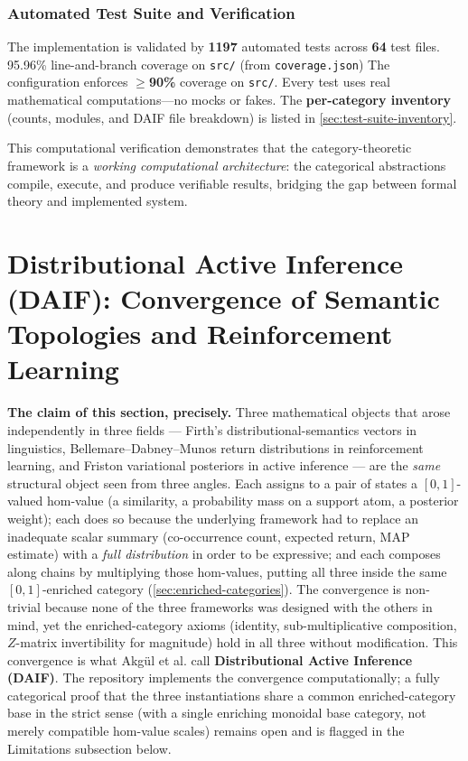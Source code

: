 \documentclass[
]{article}
\newcounter{none} %
\begin{document}
\subsubsection{Automated Test Suite and
Verification}\label{automated-test-suite-and-verification}

The implementation is validated by \textbf{1197} automated tests across
\textbf{64} test files. 95.96\% line-and-branch coverage on
\texttt{src/} (from \texttt{coverage.json}) The configuration enforces
\textbf{\texorpdfstring{\ensuremath{\geq}}{>=}90\%} coverage on \texttt{src/}. Every test uses real
mathematical computations---no mocks or fakes. The \textbf{per-category
inventory} (counts, modules, and DAIF file breakdown) is listed in
\autoref{sec:test-suite-inventory}.

This computational verification demonstrates that the category-theoretic
framework is a \emph{working computational architecture}: the
categorical abstractions compile, execute, and produce verifiable
results, bridging the gap between formal theory and implemented system.

\newpage

\section{Distributional Active Inference (DAIF): Convergence of Semantic
Topologies and Reinforcement Learning}\label{sec:daif-results}

\textbf{The claim of this section, precisely.} Three mathematical
objects that arose independently in three fields --- Firth's
distributional-semantics vectors \citeyearpar{firth1957papers} in
linguistics, Bellemare--Dabney--Munos return distributions
\citeyearpar{bellemare2017distributional} in reinforcement learning, and
Friston variational posteriors \citeyearpar{friston2017active} in active
inference --- are the \emph{same} structural object seen from three
angles. Each assigns to a pair of states a \([0,1]\)-valued hom-value (a
similarity, a probability mass on a support atom, a posterior weight);
each does so because the underlying framework had to replace an
inadequate scalar summary (co-occurrence count, expected return, MAP
estimate) with a \emph{full distribution} in order to be expressive; and
each composes along chains by multiplying those hom-values, putting all
three inside the same \([0,1]\)-enriched category
(\autoref{sec:enriched-categories}). The convergence is non-trivial
because none of the three frameworks was designed with the others in
mind, yet the enriched-category axioms (identity, sub-multiplicative
composition, \(Z\)-matrix invertibility for magnitude) hold in all three
without modification. This convergence is what Akgül et al.
\citeyearpar{akgul2026distributional} call \textbf{Distributional Active
Inference (DAIF)}. The repository implements the convergence
computationally; a fully categorical proof that the three instantiations
share a common enriched-category base in the strict sense (with a single
enriching monoidal base category, not merely compatible hom-value
scales) remains open and is flagged in the Limitations subsection below.
\end{document}
